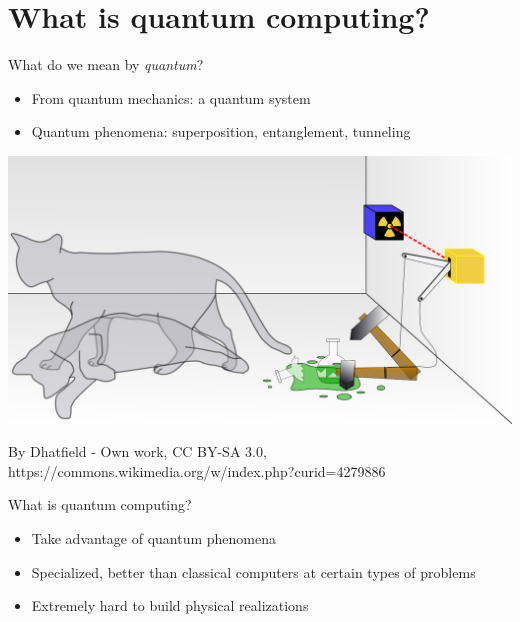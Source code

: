 \documentclass[14pt]{beamer}
\begin{document}
\section{What is quantum computing?}
\begin{frame}{What do we mean by \textit{quantum}?}
\begin{itemize}
	\item From quantum mechanics: a quantum system
	\item Quantum phenomena: superposition, 	entanglement, tunneling 
\end{itemize}
\begin{center}
\includegraphics[scale=0.15]{../resources/images/Schrodingers_cat.png}\\
{\tiny By Dhatfield - Own work, CC BY-SA 3.0, https://commons.wikimedia.org/w/index.php?curid=4279886\par}
\end{center}
\end{frame}

\begin{frame}{What is quantum computing?}
\begin{itemize}
	\item Take advantage of quantum phenomena	
	\item Specialized, better than classical computers at certain types of problems
	\item Extremely hard to build physical realizations
\end{itemize}
\end{frame}

\end{document}
